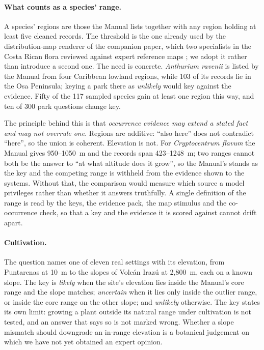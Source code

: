 \documentclass[11pt,a4paper]{article}
\begin{document}
\paragraph{What counts as a species' range.} A species' regions are those the Manual
lists together with any region holding at least five cleaned records. The threshold
is the one already used by the distribution-map renderer of the companion paper,
which two specialists in the Costa Rican flora reviewed against expert reference maps
\citep{araya2026grounding}; we adopt it rather than introduce a second one. The need
is concrete. \emph{Anthurium ravenii} is listed by the Manual from four Caribbean
lowland regions, while 103 of its records lie in the Osa Peninsula; keying a park
there as \emph{unlikely} would key against the evidence. Fifty of the 117 sampled
species gain at least one region this way, and ten of 300 park questions change key.

The principle behind this is that \emph{occurrence evidence may extend a stated fact
and may not overrule one}. Regions are additive: ``also here'' does not contradict
``here'', so the union is coherent. Elevation is not. For \emph{Cryptocentrum flavum}
the Manual gives 950--1050~m and the records span 423--1248~m; two ranges cannot both
be the answer to ``at what altitude does it grow'', so the Manual's stands as the key
and the competing range is withheld from the evidence shown to the systems. Without
that, the comparison would measure which source a model privileges rather than
whether it answers truthfully. A single definition of the range is read by the keys,
the evidence pack, the map stimulus and the co-occurrence check, so that a key and
the evidence it is scored against cannot drift apart.

\paragraph{Cultivation.} The question names one of eleven real settings with its
elevation, from Puntarenas at 10~m to the slopes of Volcán Irazú at 2{,}800~m, each on
a known slope. The key is \emph{likely} when the site's elevation lies inside the
Manual's core range and the slope matches; \emph{uncertain} when it lies only inside
the outlier range, or inside the core range on the other slope; and \emph{unlikely}
otherwise. The key states its own limit: growing a plant outside its natural range
under cultivation is not tested, and an answer that says so is not marked wrong.
Whether a slope mismatch should downgrade an in-range elevation is a botanical
judgement on which we have not yet obtained an expert opinion.
\end{document}
